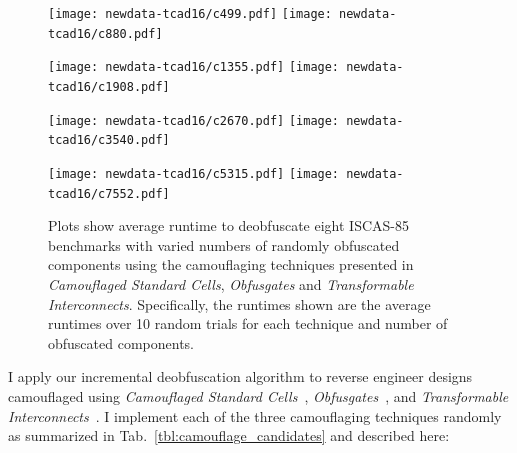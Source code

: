 \documentclass[proposal]{umassthesis}  %
\begin{document}
\begin{figure}[!hbt]
  \centering
    \texttt{[image: newdata-tcad16/c499.pdf]} \hspace{.3cm}
    \texttt{[image: newdata-tcad16/c880.pdf]} 
    \vspace{-2mm}

    \texttt{[image: newdata-tcad16/c1355.pdf]} \hspace{.3cm}
    \texttt{[image: newdata-tcad16/c1908.pdf]} 
        \vspace{-2mm}

    \texttt{[image: newdata-tcad16/c2670.pdf]} \hspace{.3cm}
    \texttt{[image: newdata-tcad16/c3540.pdf]}
        \vspace{-2mm}

    \texttt{[image: newdata-tcad16/c5315.pdf]} \hspace{.3cm}
    \texttt{[image: newdata-tcad16/c7552.pdf]}

    \caption{Plots show average runtime to deobfuscate eight ISCAS-85 benchmarks with varied numbers of randomly obfuscated components using the camouflaging techniques presented in {\textit{Camouflaged Standard Cells}\cite{rajendran-13}, \textit{Obfusgates}\cite{malik-obfusgate} and \textit{Transformable Interconnects}\cite{chen-2015-dummyWire}}. Specifically, the runtimes shown are the average runtimes over 10 random trials for each technique and number of obfuscated components.}
    \label{fig:tcad16-comparison}
\end{figure}
I apply our incremental deobfuscation algorithm to reverse engineer designs camouflaged using \textit{Camouflaged Standard Cells}~\cite{rajendran-13}, \textit{Obfusgates}~\cite{malik-obfusgate}, and \textit{Transformable Interconnects}~\cite{chen-2015-dummyWire}. I implement each of the three camouflaging techniques randomly as summarized in Tab.~\ref{tbl:camouflage_candidates} and described here: 
\end{document}
